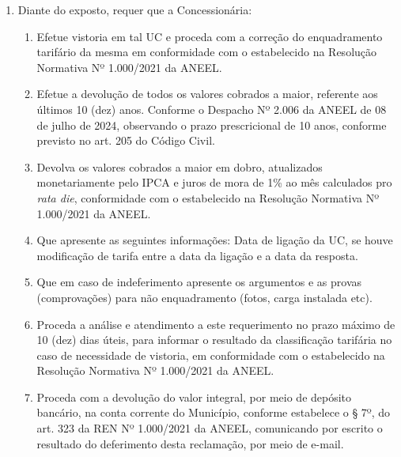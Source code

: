 \begin{enumerate}[resume]
\item 
Diante do exposto, requer que a Concessionária:

\begin{enumerate}
\item 
Efetue vistoria em tal UC e proceda com a correção do enquadramento tarifário da mesma em conformidade com o estabelecido na Resolução Normativa Nº 1.000/2021 da ANEEL.
\item 
Efetue a devolução de todos os valores cobrados a maior, referente aos últimos 10 (dez) anos. Conforme o Despacho Nº 2.006 da ANEEL de 08 de julho de 2024, observando o prazo prescricional de 10 anos, conforme previsto no art. 205 do Código Civil.
\item 
Devolva os valores cobrados a maior em dobro, atualizados monetariamente pelo IPCA e juros de mora de 1\% ao mês calculados pro \textit{rata die}, conformidade com o estabelecido na Resolução Normativa Nº 1.000/2021 da ANEEL.   
\item 
Que apresente as seguintes informações: Data de ligação da UC, se houve modificação de tarifa entre a data da ligação e a data da resposta.   
\item 
Que em caso de indeferimento apresente os argumentos e as provas (comprovações) para não enquadramento (fotos, carga instalada etc).   
\item 
Proceda a análise e atendimento a este requerimento no prazo máximo de 10 (dez) dias úteis, para informar o resultado da classificação tarifária no caso de necessidade de vistoria, em conformidade com o estabelecido na Resolução Normativa Nº 1.000/2021 da ANEEL.  
\item 
Proceda com a devolução do valor integral, por meio de depósito bancário, na conta corrente do Município, conforme estabelece o § 7º, do art. 323 da REN Nº 1.000/2021 da ANEEL, comunicando por escrito o resultado do deferimento desta reclamação, por meio de e-mail.

\end{enumerate}
\end{enumerate}